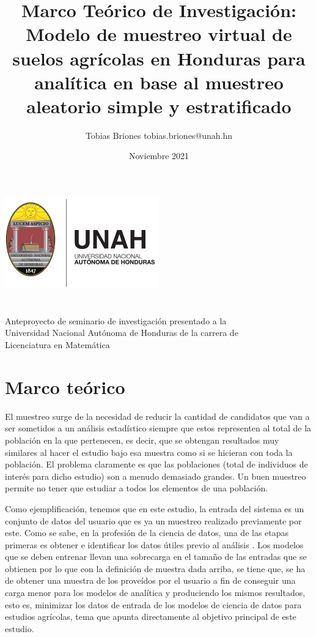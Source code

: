 \documentclass{report}
\title{Marco Teórico de Investigación: Modelo de muestreo virtual de suelos agrícolas en Honduras para analítica en base al muestreo aleatorio simple y estratificado}
\author{Tobias Briones \bigbreak tobias.briones@unah.hn}
\date{Noviembre 2021}
\begin{document}
\makeatletter
    \begin{titlepage}
        \begin{center}
            \includegraphics[width=0.3\linewidth]{ref/logo-unah.png}\\[4ex]
            {\huge \bfseries \@title 
            \vspace{1cm}}\\[2ex]
            {\LARGE \@author}\\[50ex] 
            
            {\large
            Anteproyecto de seminario de investigación presentado a la\\
            Universidad Nacional Autónoma de Honduras de la carrera de\\
            Licenciatura en Matemática
            }\\[2ex]
            
            {\large \@date}
        \end{center}
    \end{titlepage}
\makeatother
\thispagestyle{empty}
\newpage

\thispagestyle{empty}
\tableofcontents
\listoffigures
\newpage

\chapter{Marco teórico}

El muestreo surge de la necesidad de reducir la cantidad de candidatos que van a ser sometidos a un análisis estadístico siempre que estos representen al total de la población en la que pertenecen, es decir, que se obtengan resultados muy similares al hacer el estudio bajo esa muestra como si se hicieran con toda la población. El problema claramente es que las poblaciones (total de individuos de interés para dicho estudio) son a menudo demasiado grandes. Un buen muestreo permite no tener que estudiar a todos los elementos de una población. 

\bigbreak

Como ejemplificación, tenemos que en este estudio, la entrada del sistema es un conjunto de datos del usuario que es ya un muestreo realizado previamente por este. Como se sabe, en la profesión de la ciencia de datos, una de las etapas primeras es obtener e identificar los datos útiles previo al análisis \cite{university-of-wisconsin-data-science-2021}. Los modelos que se deben entrenar llevan una sobrecarga en el tamaño de las entradas que se obtienen por lo que con la definición de muestra dada arriba, se tiene que, se ha de obtener una muestra de los  proveídos por el usuario a fin de conseguir una carga menor para los modelos de analítica y produciendo los mismos resultados, esto es, minimizar los datos de entrada de los modelos de ciencia de datos para estudios agrícolas, tema que apunta directamente al objetivo principal de este estudio.
\end{document}

